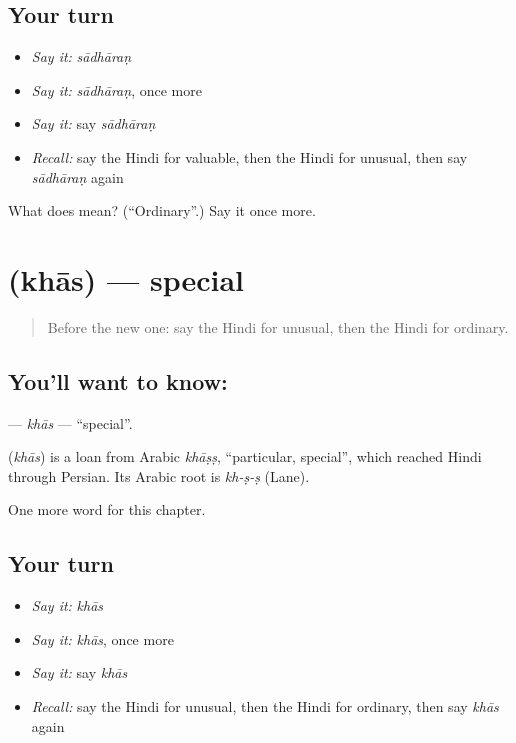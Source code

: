\subsection*{Your turn}
\begin{itemize}
\raggedright
  \item \emph{Say it:} \emph{sādhāraṇ}
  \item \emph{Say it:} \emph{sādhāraṇ}, once more
  \item \emph{Say it:} say \emph{sādhāraṇ}
  \item \emph{Recall:} say the Hindi for valuable, then the Hindi for unusual, then say \emph{sādhāraṇ} again
\end{itemize}

\begin{tcolorbox}[breakable,colback=teal!4,colframe=teal!35!black,title={Before you move on}]
What does  mean? (\textquotedblleft{}Ordinary\textquotedblright{}.) Say it once more.
\end{tcolorbox}
\section[\texorpdfstring{\hi{ख़ास} (khās)}{ख़ास (khās)}]{ (khās) — special}

\label{lesson:HI-C242-khas}



\begin{quote}
Before the new one: say the Hindi for unusual, then the Hindi for ordinary.
\end{quote}

\subsection*{You'll want to know: }
\textbf{} — \emph{khās} — \textquotedblleft{}special\textquotedblright{}.

\begin{cousinweb}
\textbf{} (\emph{khās}) is a loan from Arabic \emph{khāṣṣ}, \textquotedblleft{}particular, special\textquotedblright{}, which reached Hindi through Persian. Its Arabic root is \emph{kh-ṣ-ṣ} (Lane).
\end{cousinweb}

\begin{grammarlens}[title={What you've built}]
One more word for this chapter.
\end{grammarlens}

\subsection*{Your turn}
\begin{itemize}
\raggedright
  \item \emph{Say it:} \emph{khās}
  \item \emph{Say it:} \emph{khās}, once more
  \item \emph{Say it:} say \emph{khās}
  \item \emph{Recall:} say the Hindi for unusual, then the Hindi for ordinary, then say \emph{khās} again
\end{itemize}

